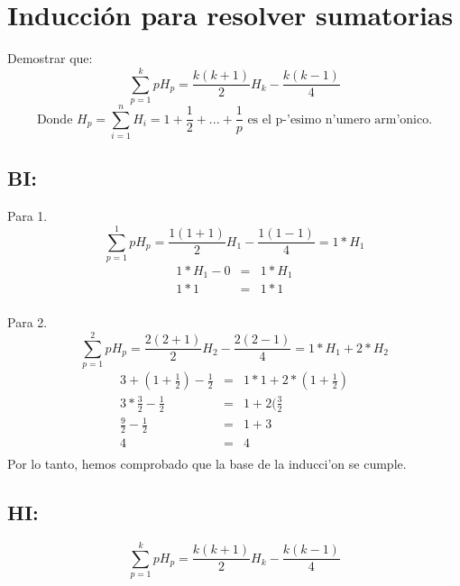 \section{Inducci\'on para resolver sumatorias} 
Demostrar que:
\begin{equation*}
 \sum_{p=1}^{k} pH_{p} = \frac{k(k+1)}{2}H_{k} - \frac{k(k-1)}{4}
\end{equation*}
\begin{equation*}
 \textrm{Donde } H_{p} = \sum_{i=1}^{n} H_{i} = 1 + \frac{1}{2} + ...  + \frac{1}{p} \textrm{ es el p-'esimo n'umero arm'onico.}
\end{equation*}
\subsection{BI:}
Para 1.
\begin{equation*}
 \sum_{p=1}^{1} pH_{p} = \frac{1(1+1)}{2}H_{1} - \frac{1(1-1)}{4} = 1*H_{1}
\end{equation*}
\begin{eqnarray*}
  1*H_{1} - 0 &=& 1*H_{1}\\
  1*1 &=& 1*1\\
\end{eqnarray*}

Para 2.
\begin{equation*}
 \sum_{p=1}^{2} pH_{p} = \frac{2(2+1)}{2}H_{2} - \frac{2(2-1)}{4} = 1*H_{1} + 2*H_{2}
\end{equation*}
\begin{eqnarray*}
 3 + (1 + \frac{1}{2}) - \frac{1}{2} &=& 1*1 + 2*(1 + \frac{1}{2})\\
 3*\frac{3}{2} - \frac{1}{2} &=& 1 + 2(\frac{3}{2}\\
 \frac{9}{2} - \frac{1}{2} &=& 1 + 3\\
 4 &=& 4\\
\end{eqnarray*}
Por lo tanto, hemos comprobado que la base de la inducci'on se cumple.

\subsection{HI:}
\begin{equation*}
 \sum_{p=1}^{k} pH_{p} = \frac{k(k+1)}{2}H_{k} - \frac{k(k-1)}{4}
\end{equation*}

